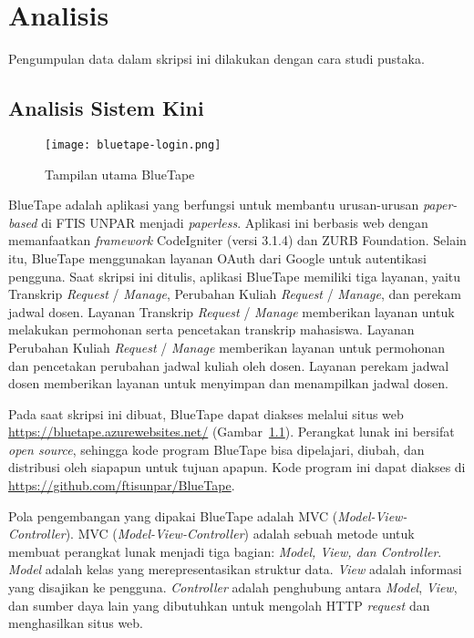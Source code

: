 
\chapter{Analisis}
\label{chap:analisis}
	Pengumpulan data dalam skripsi ini dilakukan dengan cara studi pustaka.

\section{Analisis Sistem Kini}
\label{sec:analisiskini}
\begin{figure}[H]
	\centering  
	\texttt{[image: bluetape-login.png]}  
	\caption[Tampilan utama BlueTape]{Tampilan utama BlueTape} 
	\label{fig:bluetape-login} 
\end{figure}

	BlueTape adalah aplikasi yang berfungsi untuk membantu urusan-urusan \textit{paper-based} di FTIS UNPAR menjadi \textit{paperless}. Aplikasi ini berbasis web dengan memanfaatkan \textit{framework} CodeIgniter (versi 3.1.4) dan ZURB Foundation. Selain itu, BlueTape menggunakan layanan OAuth dari Google untuk autentikasi pengguna. Saat skripsi ini ditulis, aplikasi BlueTape memiliki tiga layanan, yaitu Transkrip \textit{Request} / \textit{Manage}, Perubahan Kuliah \textit{Request} / \textit{Manage}, dan perekam jadwal dosen. Layanan Transkrip \textit{Request} / \textit{Manage} memberikan layanan untuk melakukan permohonan serta pencetakan transkrip mahasiswa. Layanan Perubahan Kuliah \textit{Request} / \textit{Manage} memberikan layanan untuk permohonan dan pencetakan perubahan jadwal kuliah oleh dosen. Layanan perekam jadwal dosen memberikan layanan untuk menyimpan dan menampilkan jadwal dosen. \footnotemark

	Pada saat skripsi ini dibuat, BlueTape dapat diakses melalui situs web \url{https://bluetape.azurewebsites.net/} (Gambar~\ref{fig:bluetape-login}). Perangkat lunak ini bersifat \textit{open source}, sehingga kode program BlueTape bisa dipelajari, diubah, dan distribusi oleh siapapun untuk tujuan apapun. Kode program ini dapat diakses di \url{https://github.com/ftisunpar/BlueTape}.
	
	Pola pengembangan yang dipakai BlueTape adalah MVC (\textit{Model-View-Controller}). MVC (\textit{Model-View-Controller}) adalah sebuah metode untuk membuat perangkat lunak menjadi tiga bagian: \textit{Model, View, dan Controller}. \textit{Model} adalah kelas yang merepresentasikan struktur data. \textit{View} adalah informasi yang disajikan ke pengguna. \textit{Controller} adalah penghubung antara \textit{Model}, \textit{View}, dan sumber daya lain yang dibutuhkan untuk mengolah HTTP \textit{request} dan menghasilkan situs web.

